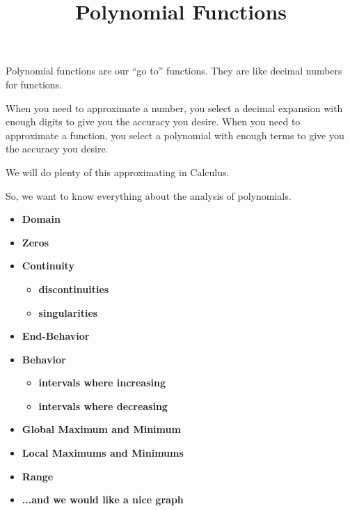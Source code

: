 \documentclass{ximera}
\title{Polynomial Functions}
\begin{document}
\begin{abstract}
\end{abstract}
\maketitle






Polynomial functions are our ``go to'' functions.  They are like decimal numbers for functions.  

When you need to approximate a number, you select a decimal expansion with enough digits to give you the accuracy you desire. When you need to approximate a function, you select a polynomial with enough terms to give you the accuracy you desire. 

We will do plenty of this approximating in Calculus.

So, we want to know everything about the analysis of polynomials.







\begin{itemize}
     \item \textbf{\textcolor{red!80!black}{Domain}} 
     \item \textbf{\textcolor{red!80!black}{Zeros}} 
     \item \textbf{\textcolor{red!80!black}{Continuity}} 
\begin{itemize}
     \item \textbf{\textcolor{purple!85!blue}{discontinuities}} 
     \item \textbf{\textcolor{purple!85!blue}{singularities}} 
\end{itemize}
     \item \textbf{\textcolor{red!80!black}{End-Behavior}} 
     \item \textbf{\textcolor{red!80!black}{Behavior}} 
\begin{itemize}
     \item \textbf{\textcolor{purple!85!blue}{intervals where increasing}} 
     \item \textbf{\textcolor{purple!85!blue}{intervals where decreasing}} 
\end{itemize}
     \item \textbf{\textcolor{red!80!black}{Global Maximum and Minimum}} 
     \item \textbf{\textcolor{red!80!black}{Local Maximums and Minimums}} 
     \item \textbf{\textcolor{red!80!black}{Range}} 
     \item \textbf{\textcolor{blue!55!black}{...and we would like a nice graph}} 
\end{itemize}
\end{document}
